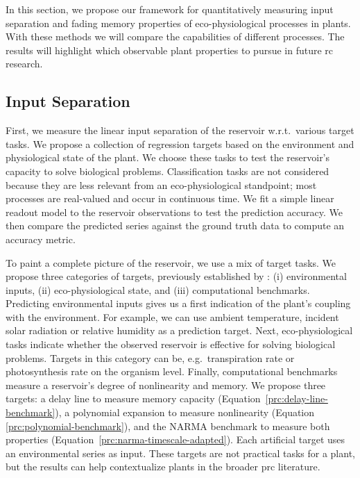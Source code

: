 
In this section, we propose our framework for quantitatively measuring input separation and fading memory properties of eco-physiological processes in plants.
With these methods we will compare the capabilities of different processes.
The results will highlight which observable plant properties to pursue in future \acrshort{rc} research.


\subsection{Input Separation}


First, we measure the linear input separation of the reservoir w.r.t.\ various target tasks.
We propose a collection of regression targets based on the environment and physiological state of the plant.
We choose these tasks to test the reservoir's capacity to solve biological problems.
Classification tasks are not considered because they are less relevant from an eco-physiological standpoint; 
most processes are real-valued and occur in continuous time.
We fit a simple linear readout model to the reservoir observations to test the prediction accuracy.
We then compare the predicted series against the ground truth data to compute an accuracy metric.


To paint a complete picture of the reservoir, we use a mix of target tasks.
We propose three categories of targets, previously established by \citet{pieters_reservoir_2022}: (i) environmental inputs, (ii) eco-physiological state, and (iii) computational benchmarks.
Predicting environmental inputs gives us a first indication of the plant's coupling with the environment.
For example, we can use ambient temperature, incident solar radiation or relative humidity as a prediction target.
Next, eco-physiological tasks indicate whether the observed reservoir is effective for solving biological problems.
Targets in this category can be, e.g.\ transpiration rate or photosynthesis rate on the organism level.
Finally, computational benchmarks measure a reservoir's degree of nonlinearity and memory.
We propose three targets: a delay line to measure memory capacity (\mbox{Equation \ref{prc:delay-line-benchmark}}), a polynomial expansion to measure nonlinearity (Equation \ref{prc:polynomial-benchmark}), and the NARMA benchmark to measure both properties (\mbox{Equation \ref{prc:narma-timescale-adapted}}).
Each artificial target uses an environmental series as input.
These targets are not practical tasks for a plant, but the results can help contextualize plants in the broader \acrshort{prc} literature.


